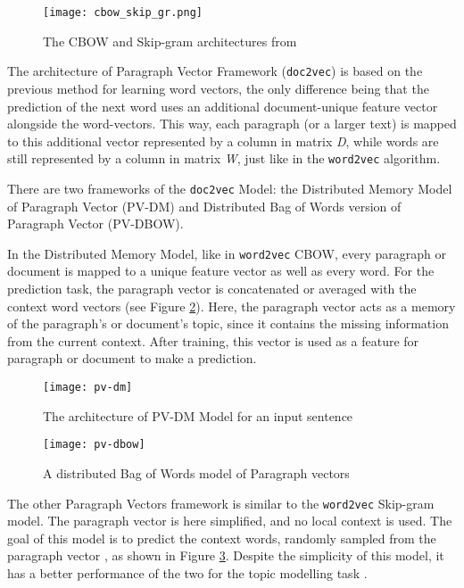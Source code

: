\documentclass[fontsize=12pt,a4paper,twoside,openany]{scrbook}
\begin{document}
\begin{figure}[h]
\centering
\texttt{[image: cbow\_skip\_gr.png]}
\caption{The CBOW and Skip-gram architectures from \parencite{TMikolov13}}
\label{fig:cbow_skip_gr}
\end{figure}

The architecture of Paragraph Vector Framework (\verb|doc2vec|) is based on the previous method for learning word vectors, the only difference being that the prediction of the next word uses an additional document-unique feature vector alongside the word-vectors. This way, each paragraph (or a larger text) is mapped to this additional vector represented by a column in matrix \emph{D}, while words are still represented by a column in matrix \emph{W}, just like in the \verb|word2vec| algorithm. 

There are two frameworks of the \verb|doc2vec| Model: the Distributed Memory Model of Paragraph Vector (PV-DM) and Distributed Bag of Words version of Paragraph Vector (PV-DBOW).

In the Distributed Memory Model, like in \verb|word2vec| CBOW, every paragraph or document is mapped to a unique feature vector as well as every word. For the prediction task, the paragraph vector is concatenated or averaged with the context word vectors (see Figure \ref{fig:pv-dm}). Here, the paragraph vector acts as a memory of the paragraph's or document's topic, since it contains the missing information from the current context. After training, this vector is used as a feature for paragraph or document to make a prediction.

\begin{figure}[!ht]
\centering
\texttt{[image: pv-dm]}
\caption{The architecture of PV-DM Model for an input sentence}
\label{fig:pv-dm}
\end{figure}

\begin{figure}[!ht]
\centering
\texttt{[image: pv-dbow]}
\caption{A distributed Bag of Words model of Paragraph vectors}
\label{fig:pv-dbow}
\end{figure}

The other Paragraph Vectors framework is similar to the \verb|word2vec| Skip-gram model. The paragraph vector is here simplified, and no local context is used. The goal of this model is to predict the context words, randomly sampled from the paragraph vector \parencite{Le14}, as shown in Figure \ref{fig:pv-dbow}. Despite the simplicity of this model, it has a better performance of the two for the topic modelling task \parencite{Angelov20}.
\end{document}
